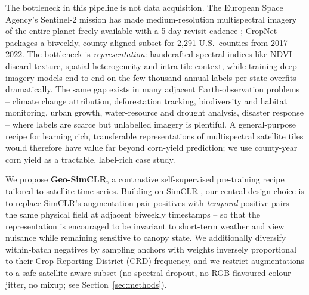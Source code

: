 \documentclass{article}
\begin{document}
The bottleneck in this pipeline is not data acquisition. The European Space
Agency's Sentinel-2 mission has made medium-resolution multispectral imagery of
the entire planet freely available with a 5-day revisit cadence
\citep{drusch2012sentinel2}; CropNet \citep{lin2024cropnet} packages a
biweekly, county-aligned subset for 2{,}291 U.S.\ counties from 2017--2022.
The bottleneck is \emph{representation}: handcrafted spectral indices like NDVI
discard texture, spatial heterogeneity and intra-tile context, while training
deep imagery models end-to-end on the few thousand annual labels per state
overfits dramatically. The same gap exists in many adjacent Earth-observation
problems -- climate change attribution, deforestation tracking, biodiversity
and habitat monitoring, urban growth, water-resource and drought analysis,
disaster response -- where labels are scarce but unlabelled imagery is plentiful.
A general-purpose recipe for learning rich, transferable representations of
multispectral satellite tiles would therefore have value far beyond corn-yield
prediction; we use county-year corn yield as a tractable, label-rich case
study.

We propose \textbf{Geo-SimCLR}, a contrastive self-supervised pre-training
recipe tailored to satellite time series. Building on SimCLR
\citep{chen2020simclr}, our central design choice is to replace SimCLR's
augmentation-pair positives with \emph{temporal} positive pairs --
the same physical field at adjacent biweekly timestamps -- so that the
representation is encouraged to be invariant to short-term weather and view
nuisance while remaining sensitive to canopy state. We additionally diversify
within-batch negatives by sampling anchors with weights inversely proportional
to their Crop Reporting District (CRD) frequency, and we restrict augmentations
to a safe satellite-aware subset (no spectral dropout, no RGB-flavoured colour
jitter, no mixup; see Section~\ref{sec:methods}).
\end{document}
